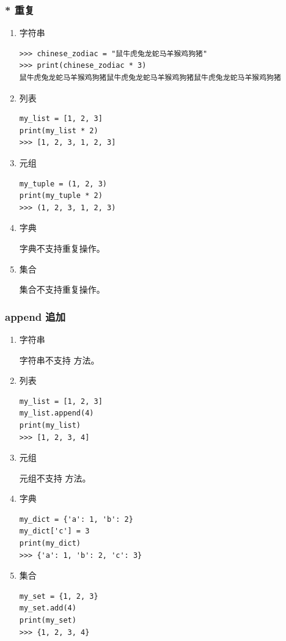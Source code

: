 \subsubsection{* 重复}
\begin{enumerate}[label=\arabic*)]
    \item 字符串
\begin{lstlisting}[style=demostyle,numbers=none]
>>> chinese_zodiac = "鼠牛虎兔龙蛇马羊猴鸡狗猪"
>>> print(chinese_zodiac * 3)
鼠牛虎兔龙蛇马羊猴鸡狗猪鼠牛虎兔龙蛇马羊猴鸡狗猪鼠牛虎兔龙蛇马羊猴鸡狗猪
\end{lstlisting}

    \item 列表
\begin{lstlisting}[style=demostyle,numbers=none]
my_list = [1, 2, 3]
print(my_list * 2)  
>>> [1, 2, 3, 1, 2, 3]
\end{lstlisting}

    \item 元组
\begin{lstlisting}[style=demostyle,numbers=none]
my_tuple = (1, 2, 3)
print(my_tuple * 2)  
>>> (1, 2, 3, 1, 2, 3)
\end{lstlisting}

    \item 字典

    字典不支持重复操作。

    \item 集合

    集合不支持重复操作。

\end{enumerate}

\subsubsection{append 追加}
\begin{enumerate}[label=\arabic*)]
    \item 字符串

    字符串不支持  方法。

    \item 列表
\begin{lstlisting}[style=demostyle,numbers=none]
my_list = [1, 2, 3]
my_list.append(4)
print(my_list)  
>>> [1, 2, 3, 4]
\end{lstlisting}

    \item 元组

    元组不支持  方法。

    \item 字典
\begin{lstlisting}[style=demostyle,numbers=none]
my_dict = {'a': 1, 'b': 2}
my_dict['c'] = 3
print(my_dict)  
>>> {'a': 1, 'b': 2, 'c': 3}
\end{lstlisting}

    \item 集合
\begin{lstlisting}[style=demostyle,numbers=none]
my_set = {1, 2, 3}
my_set.add(4)
print(my_set)  
>>> {1, 2, 3, 4}
\end{lstlisting}
\end{enumerate}

